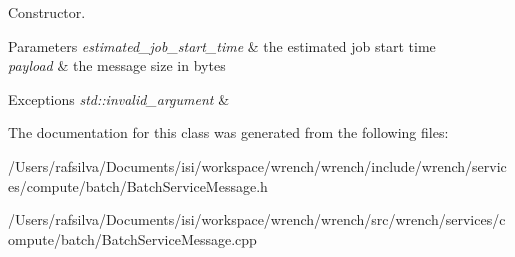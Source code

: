 Constructor. 


\begin{DoxyParams}{Parameters}
{\em estimated\+\_\+job\+\_\+start\+\_\+time} & the estimated job start time \\
\hline
{\em payload} & the message size in bytes\\
\hline
\end{DoxyParams}

\begin{DoxyExceptions}{Exceptions}
{\em std\+::invalid\+\_\+argument} & \\
\hline
\end{DoxyExceptions}


The documentation for this class was generated from the following files\+:\begin{DoxyCompactItemize}
\item 
/\+Users/rafsilva/\+Documents/isi/workspace/wrench/wrench/include/wrench/services/compute/batch/Batch\+Service\+Message.\+h\item 
/\+Users/rafsilva/\+Documents/isi/workspace/wrench/wrench/src/wrench/services/compute/batch/Batch\+Service\+Message.\+cpp\end{DoxyCompactItemize}
